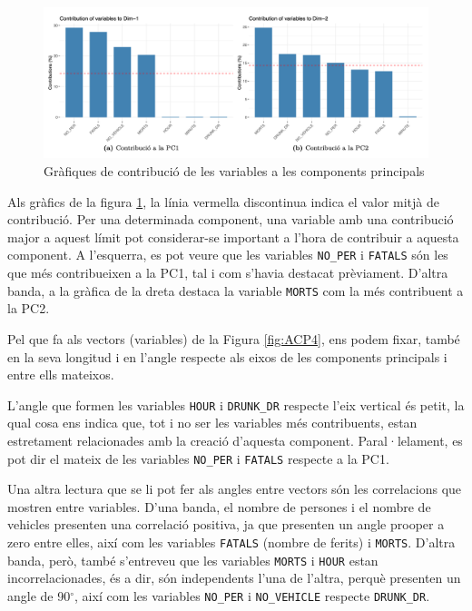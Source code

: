 \documentclass[12pt,longbibliography]{article}
\theoremstyle{definition}
\theoremstyle{remark}
\begin{document}
\begin{figure}[H]
\begin{center}
\includegraphics[width=15cm]{acp5}
\end{center}
\caption{Gràfiques de contribució de les variables a les components principals}
\label{fig:ACP5}
\end{figure}


Als gràfics de la figura \ref{fig:ACP5}, la línia vermella discontinua indica el valor mitjà de contribució. Per una determinada component, una variable amb una contribució major a aquest límit pot considerar-se important a l'hora de contribuir a aquesta component. A l'esquerra, es pot veure que les variables \texttt{NO\_PER} i \texttt{FATALS} són les que més contribueixen a la PC1, tal i com s'havia destacat prèviament. D'altra banda, a la gràfica de la dreta destaca la variable \texttt{MORTS} com la més contribuent a la PC2.


Pel que fa als vectors (variables) de la Figura \ref{fig:ACP4}, ens podem fixar, també en la seva longitud i en l'angle respecte als eixos de les components principals i entre ells mateixos. 


L'angle que formen les variables \texttt{HOUR} i \texttt{DRUNK\_DR} respecte l'eix vertical és petit, la qual cosa ens indica que, tot i no ser les variables més contribuents, estan estretament relacionades amb la creació d'aquesta component. Paral·lelament, es pot dir el mateix de les variables \texttt{NO\_PER} i \texttt{FATALS} respecte a la PC1.


Una altra lectura que se li pot fer als angles entre vectors són les correlacions que mostren entre variables. D'una banda, el nombre de persones i el nombre de vehicles presenten una correlació positiva, ja que presenten un angle prooper a zero entre elles, així com les variables \texttt{FATALS} (nombre de ferits) i \texttt{MORTS}. D'altra banda, però, també s'entreveu que les variables \texttt{MORTS} i \texttt{HOUR} estan incorrelacionades, és a dir, són independents l'una de l'altra, perquè presenten un angle de 90$^\circ$, així com les variables \texttt{NO\_PER} i \texttt{NO\_VEHICLE} respecte \texttt{DRUNK\_DR}.
\end{document}
